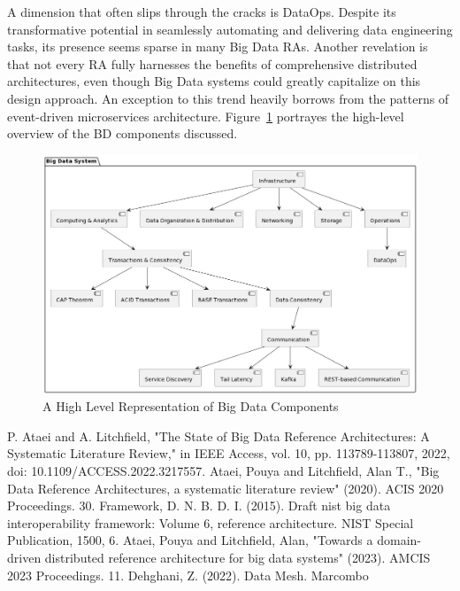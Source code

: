\documentclass[conference]{IEEEtran}
\begin{document}
A dimension that often slips through the cracks is DataOps. Despite its transformative potential in seamlessly automating and delivering data engineering tasks, its presence seems sparse in many Big Data RAs. Another revelation is that not every RA fully harnesses the benefits of comprehensive distributed architectures, even though Big Data systems could greatly capitalize on this design approach. An exception to this trend heavily borrows from the patterns of event-driven microservices architecture. Figure~\ref{BDcomponents} portrayes the high-level overview of the BD components discussed.

\begin{figure}[h!]
    \centering
    \includegraphics[width=12cm]{media/three-layer-bd.png}
    \caption{A High Level Representation of Big Data Components}
    \label{BDcomponents}
\end{figure}

\begin{thebibliography}{00}


 P. Ataei and A. Litchfield, "The State of Big Data Reference Architectures: A Systematic Literature Review," in IEEE Access, vol. 10, pp. 113789-113807, 2022, doi: 10.1109/ACCESS.2022.3217557.
 Ataei, Pouya and Litchfield, Alan T., "Big Data Reference Architectures, a systematic literature review" (2020). ACIS 2020 Proceedings. 30.
 Framework, D. N. B. D. I. (2015). Draft nist big data interoperability framework: Volume 6, reference architecture. NIST Special Publication, 1500, 6.
 Ataei, Pouya and Litchfield, Alan, "Towards a domain-driven distributed reference architecture for big data
systems" (2023). AMCIS 2023 Proceedings. 11.
 Dehghani, Z. (2022). Data Mesh. Marcombo


\end{thebibliography}
\end{document}
